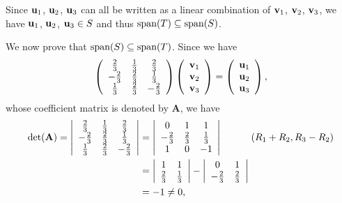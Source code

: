 \documentclass[12pt]{amsart}
\theoremstyle{plain}
\theoremstyle{definition}
\def\bf{\textbf}
\newcommand{\spa}{\textup{span}}
\begin{document}
Since $\bf u_1$, $\bf u_2$, $\bf u_3$ can all be written as a linear combination of $\bf v_1$, $\bf v_2$, $\bf v_3$, we have $\bf u_1$, $\bf u_2$, $\bf u_3\in S$ and thus $\spa(T)\subseteq\spa(S)$. 

We now prove that $\spa(S)\subseteq \spa(T)$. Since we have
\begin{align*}
	\left(
	\begin{array}{ccc}
		\frac23 & \frac13 & \frac23\\
		-\frac23 & \frac23 & \frac13\\
		\frac13 & \frac23 & -\frac23\\
	\end{array}
	\right)
	\left(
	\begin{array}{c}
		\bf v_1\\
		\bf v_2\\
		\bf v_3
	\end{array}
	\right)=
	\left(
	\begin{array}{c}
		\bf u_1\\
		\bf u_2\\
		\bf u_3
	\end{array}
	\right),
\end{align*}
whose coefficient matrix is denoted by \bf A, we have
\begin{align*}
	\det(\bf A)=
	\left|
	\begin{array}{ccc}
		\frac23 & \frac13 & \frac23\\
		-\frac23 & \frac23 & \frac13\\
		\frac13 & \frac23 & -\frac23\\
	\end{array}
	\right|&=\left|
	\begin{array}{ccc}
		0 & 1 & 1\\
		-\frac23 & \frac23 & \frac13\\
		1 & 0 & -1\\
	\end{array}
	\right|\indent \indent (R_1+R_2, R_3-R_2)\\
	&=\left|
	\begin{array}{ccc}
		1 & 1\\
		\frac23 & \frac13\\
	\end{array}
	\right|-\left|
	\begin{array}{ccc}
		0 & 1\\
		-\frac23 & \frac23\\
	\end{array}
	\right|\\
	&=-1\neq 0,
\end{align*}
\end{document}
